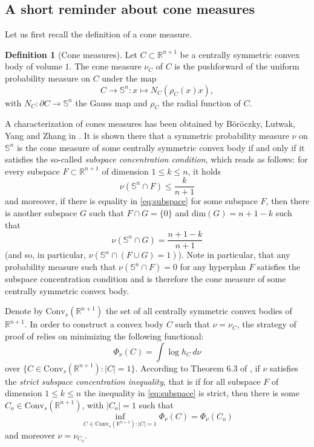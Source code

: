\documentclass[10pt]{amsart}
\theoremstyle{definition}
\newtheorem{defi}[thm]{Definition}
\theoremstyle{remark}
\newcommand{\R}{\mathbb{R}}
\newcommand{\Sd}{\mathbb{S}}
\begin{document}
\subsection{A short reminder about cone measures}\label{sec:cone}
Let us first recall the definition of a cone measure.

\begin{defi}[Cone measures] Let $C \subset \R^{n+1}$ be a centrally symmetric convex body of volume $1$. The cone measure $\nu_C$ of $C$ is the pushforward of the uniform probability measure on $C$ under the map 
\[
C \to \Sd^n : x\mapsto N_C \left( \rho_C(x)x \right),
\]
with $N_C:\partial C \to \Sd^n$ the Gauss map and $\rho_C$ the radial function of $C$.
\end{defi}

A characterization of cones measures has been obtained by B\"or\"oczky, Lutwak, Yang and Zhang in \cite{BLYZ13}. It is shown there that a symmetric probability measure $\nu$ on $\Sd^n$ is the cone measure of some centrally symmetric convex body if and only if it satisfies the so-called \emph{subspace concentration condition}, which reads as follows: for every subspace $F \subset \R^{n+1}$ of dimension $1\leq k \leq n$, it holds 
\begin{equation}\label{eq:subspace}
\nu(\Sd^n \cap F) \leq \frac{k}{n+1} 
\end{equation}
and moreover, if there is equality in \eqref{eq:subspace} for some subspace $F$, then there is another subspace $G$ such that $F \cap G =\{0\}$ and $\mathrm{dim} (G) = n+1-k$ such that
\[
\nu(\Sd^n \cap G) = \frac{n+1-k}{n+1}
\]
(and so, in particular, $\nu(\Sd^n \cap (F\cup G) = 1)$). Note in particular, that any probability measure such that $\nu(\Sd^n \cap F)=0$ for any hyperplan $F$ satisfies the subspace concentration condition and is therefore the cone measure of some centrally symmetric convex body.

Denote by $\mathrm{Conv}_s(\R^{n+1})$ the set of all centrally symmetric convex bodies of $\R^{n+1}$. In order to construct a convex body $C$ such that $\nu=\nu_C$, the strategy of proof of \cite{BLYZ13} relies on minimizing the following functional:
\[
\Phi_\nu (C) = \int \log h_C\,d\nu
\]
over $\{C \in \mathrm{Conv}_s(\R^{n+1}) : |C|=1\}$. According to Theorem 6.3 of \cite{BLYZ13}, if $\nu$ satisfies the \emph{strict subspace concentration inequality}, that is if for all subspace $F$ of dimension $1\leq k \leq n$ the inequality in \eqref{eq:subspace} is strict, then there is some $C_o\in \mathrm{Conv}_s(\R^{n+1})$, with $|C_o|=1$ such that 
\[
\inf_{C \in \mathrm{Conv}_s(\R^{n+1}) : |C|=1} \Phi_\nu(C) = \Phi_\nu(C_o)
\]
and moreover $\nu = \nu_{C_o}$. 
\end{document}
